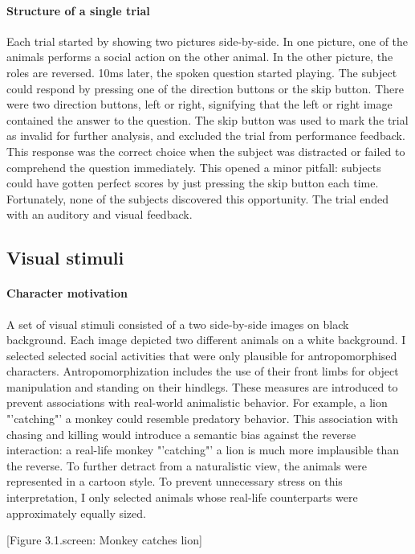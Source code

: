 \paragraph{Structure of a single trial}
Each trial started by showing two pictures side-by-side.
In one picture, one of the animals performs a social action on the other animal.
In the other picture, the roles are reversed.
10ms later, the spoken question started playing.
The subject could respond by pressing one of the direction buttons or the skip button.
There were two direction buttons, left or right, signifying that the left or right image contained the answer to the question.
The skip button was used to mark the trial as invalid for further analysis, and excluded the trial from performance feedback.
This response was the correct choice when the subject was distracted or failed to comprehend the question immediately.
This opened a minor pitfall: subjects could have gotten perfect scores by just pressing the skip button each time.
Fortunately, none of the subjects discovered this opportunity.
The trial ended with an auditory and visual feedback.


\subsection{Visual stimuli}

\paragraph{Character motivation}
A set of visual stimuli consisted of a two side-by-side images on black background.
Each image depicted two different animals on a white background.
I selected selected social activities that were only plausible for antropomorphised characters.
Antropomorphization includes the use of their front limbs for object manipulation and standing on their hindlegs.
These measures are introduced to prevent associations with real-world animalistic behavior.
For example, a lion "'catching"' a monkey could resemble predatory behavior.
This association with chasing and killing would introduce a semantic bias against the reverse interaction: a real-life monkey "'catching"' a lion is much more implausible than the reverse.
To further detract from a naturalistic view, the animals were represented in a cartoon style.
To prevent unnecessary stress on this interpretation, I only selected animals whose real-life counterparts were approximately equally sized.

[Figure 3.1.screen: Monkey catches lion]

